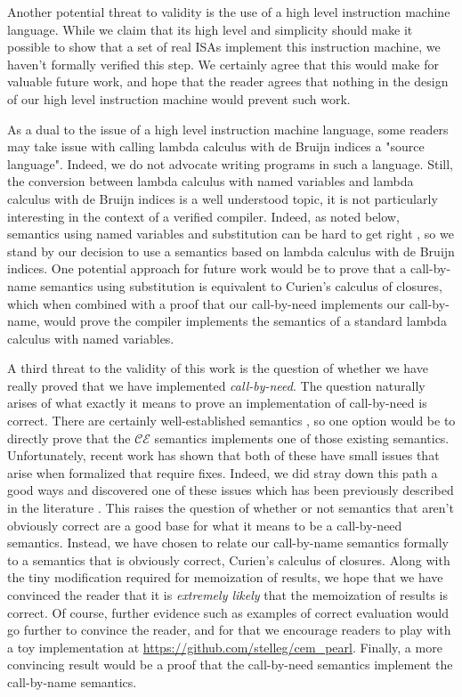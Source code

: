 Another potential threat to validity is the use of a high level instruction
machine language. While we claim that its high level and simplicity should make
it possible to show that a set of real ISAs implement this instruction machine,
we haven't formally verified this step. We certainly agree that this would make
for valuable future work, and hope that the reader agrees that nothing in the
design of our high level instruction machine would prevent such work.

As a dual to the issue of a high level instruction machine language, some
readers may take issue with calling lambda calculus with de Bruijn indices a
"source language". Indeed, we do not advocate writing programs in such a
language. Still, the conversion between lambda calculus with named variables and
lambda calculus with de Bruijn indices is a well understood topic, it is not
particularly interesting in the context of a verified compiler.  Indeed, as
noted below, semantics using named variables and substitution can be
hard to get right \cite{breitnerthesis, nakata2009small}, so we stand by our
decision to use a semantics based on lambda calculus with de Bruijn
indices. One potential approach for future work would be to prove that a
call-by-name semantics using substitution is equivalent to Curien's calculus of
closures, which when combined with a proof that our call-by-need implements our
call-by-name, would prove the compiler implements the semantics of a standard
lambda calculus with named variables.

A third threat to the validity of this work is the question of whether 
we have really proved that we have implemented \emph{call-by-need}. The question
naturally arises of what exactly it means to prove an implementation of
call-by-need is correct. There are certainly well-established semantics
\cite{launchburynatural, ariola1995call}, so one option would be to directly
prove that the $\mathcal{CE}$ semantics implements one of those existing
semantics.  Unfortunately, recent work has shown that both of these have small
issues that arise when formalized that require fixes. Indeed, we did stray down
this path a good ways and discovered one of these issues which has been
previously described in the literature \cite{nakata2009small}. This raises the
question of whether or not semantics that aren't obviously correct are a good
base for what it means to be a call-by-need semantics. Instead, we have chosen to
relate our call-by-name semantics formally to a semantics that is obviously
correct, Curien's calculus of closures. Along with the tiny modification
required for memoization of results, we hope that we have convinced the reader
that it is \emph{extremely likely} that the memoization of results is correct.
Of course, further evidence such as examples of correct evaluation would go
further to convince the reader, and for that we encourage readers to
play with a toy implementation at \url{https://github.com/stelleg/cem\_pearl}.
Finally, a more convincing result would be a proof that the call-by-need
semantics implement the call-by-name semantics. 

